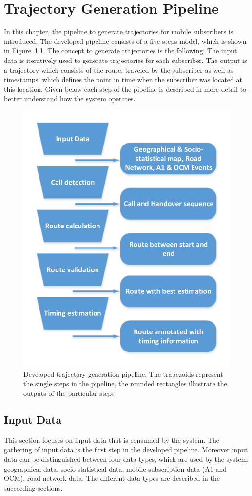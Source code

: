 \documentclass[master,english]{hgbthesis}
\begin{document}
\chapter{Trajectory Generation Pipeline}
\label{cha:concepts}
In this chapter, the pipeline to generate trajectories for mobile subscribers is introduced. The developed pipeline consists of a five-steps model, which is shown in Figure~\ref{fig:pipeline}. The concept to generate trajectories is the following: The input data is iteratively used to generate trajectories for each subscriber. The output is a trajectory which consists of the route, traveled by the subscriber as well as timestamps, which defines the point in time when the subscriber was located at this location. Given below each step of the pipeline is described in more detail to better understand how the system operates. 
\begin{figure}
	\centering
	\includegraphics[width=0.7\linewidth]{./images/pipeline}
	\caption{Developed trajectory generation pipeline. The trapezoids represent the single steps in the pipeline, the rounded rectangles illustrate the
	outputs of the particular steps}
	\label{fig:pipeline}
\end{figure}
\section{Input Data}
This section focuses on input data that is consumed by the system. The gathering of input data is the first step in the developed pipeline. Moreover input data can be distinguished between four data types, which are used by the system: geographical data, socio-statistical data, mobile subscription data (A1 and OCM), road network data. The different data types are described in the succeeding sections.
\end{document}
